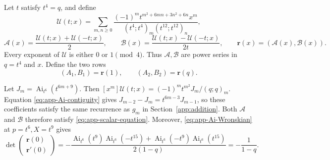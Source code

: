 \documentclass[11pt]{article}
\numberwithin{equation}{section}
\theoremstyle{remark}
\begin{document}
Let \(t\) satisfy \(t^4=q\), and define
\[
 \mathcal U(t;x)=\sum_{m,n\geq0}
 \frac{(-1)^m t^{m^2+6mn+3n^2+6n}x^m}
      {(t^4;t^4)_m(t^{12};t^{12})_n},
\]
\[
 \mathcal A(x)=\frac{\mathcal U(t;x)+\mathcal U(-t;x)}2,
 \qquad
 \mathcal B(x)=\frac{\mathcal U(t;x)-\mathcal U(-t;x)}{2t},
 \qquad \mathbf r(x)=(\mathcal A(x),\mathcal B(x)).
\]
Every exponent of \(\mathcal U\) is either \(0\) or \(1\pmod4\).
Thus \(\mathcal A,\mathcal B\) are power series in \(q=t^4\) and \(x\).
Define the two rows
\begin{equation}\label{eq:app-parity-sampling}
 (A_1,B_1)=\mathbf r(1),\qquad
 (A_2,B_2)=\mathbf r(q).
\end{equation}

Let \(J_m=\operatorname{Ai}_{t^6}(t^{6m+9})\).  Then
\([x^m]\mathcal U(t;x)=(-1)^m t^{m^2}J_m/(q;q)_m\).
Equation \eqref{eq:app-Ai-contiguity} gives
\(J_{m-2}-J_m=t^{6m-3}J_{m-1}\), so these coefficients satisfy
the same recurrence as \(g_m\) in Section~\ref{app:addition}.
Both \(\mathcal A\) and \(\mathcal B\) therefore satisfy
\eqref{eq:app-scalar-equation}.  Moreover,
\eqref{eq:app-Ai-Wronskian} at \(p=t^6,X=t^9\) gives
\begin{equation}\label{eq:app-parity-initial-determinant}
 \det\begin{pmatrix}\mathbf r(0)\\\mathbf r'(0)\end{pmatrix}
 =-\frac{
 \operatorname{Ai}_{t^6}(t^9)\operatorname{Ai}_{t^6}(-t^{15})
 +\operatorname{Ai}_{t^6}(-t^9)\operatorname{Ai}_{t^6}(t^{15})}
 {2(1-q)}=-\frac1{1-q}.
\end{equation}
\end{document}
